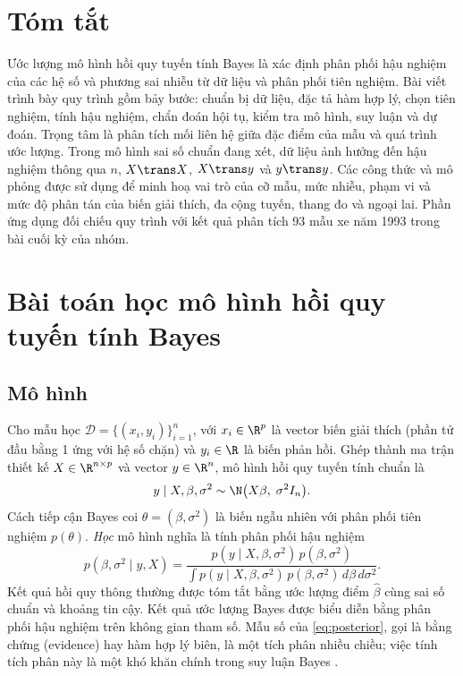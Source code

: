 \documentclass[12pt,a4paper]{report}
\begin{document}
\makereporttitlepage

\chapter*{Tóm tắt}

Ước lượng mô hình hồi quy tuyến tính Bayes là xác định phân phối hậu nghiệm
của các hệ số và phương sai nhiễu từ dữ liệu và phân phối tiên nghiệm. Bài viết
trình bày quy trình gồm bảy bước: chuẩn bị dữ liệu, đặc tả hàm hợp lý, chọn tiên
nghiệm, tính hậu nghiệm, chẩn đoán hội tụ, kiểm tra mô hình, suy luận và dự đoán.
Trọng tâm là phân tích mối liên hệ giữa đặc điểm của mẫu và quá trình ước lượng.
Trong mô hình sai số chuẩn đang xét, dữ liệu ảnh hưởng đến hậu nghiệm thông qua
$n$, $X\trans X$, $X\trans y$ và $y\trans y$. Các công thức và mô phỏng được
sử dụng để minh hoạ vai trò của cỡ mẫu, mức nhiễu, phạm vi và mức độ phân tán
của biến giải thích, đa cộng tuyến, thang đo và ngoại lai. Phần ứng dụng đối
chiếu quy trình với kết quả phân tích 93 mẫu xe năm 1993 trong bài cuối kỳ
của nhóm.

\tableofcontents
\pagebreak

\listoffigures
\listoftables
\newpage

\chapter{Bài toán học mô hình hồi quy tuyến tính Bayes}
\label{sec:problem}

\section{Mô hình}

Cho mẫu học $\mathcal{D} = \{(x_i, y_i)\}_{i=1}^{n}$, với $x_i \in \R^{p}$ là
vector biến giải thích (phần tử đầu bằng 1 ứng với hệ số chặn) và $y_i \in \R$
là biến phản hồi. Ghép thành ma trận thiết kế $X \in \R^{n \times p}$ và vector
$y \in \R^{n}$, mô hình hồi quy tuyến tính chuẩn là
%
\begin{equation}
  \label{eq:model}
  y \mid X, \beta, \sigma^2 \sim \N\bigl(X\beta,\; \sigma^2 I_n\bigr).
\end{equation}
%
Cách tiếp cận Bayes coi $\theta = (\beta, \sigma^2)$ là biến ngẫu nhiên với phân
phối tiên nghiệm $p(\theta)$. \emph{Học} mô hình nghĩa là tính phân phối hậu
nghiệm
%
\begin{equation}
  \label{eq:posterior}
  p(\beta, \sigma^2 \mid y, X) =
  \frac{p(y \mid X, \beta, \sigma^2)\, p(\beta, \sigma^2)}
       {\int p(y \mid X, \beta, \sigma^2)\, p(\beta, \sigma^2)\, d\beta\, d\sigma^2}.
\end{equation}
%
Kết quả hồi quy thông thường được tóm tắt bằng ước lượng điểm $\hat\beta$ cùng
sai số chuẩn và khoảng tin cậy. Kết quả ước lượng Bayes được biểu diễn bằng
phân phối hậu nghiệm trên không gian tham số. Mẫu số của
\eqref{eq:posterior}, gọi là bằng chứng (evidence) hay hàm hợp lý biên, là một
tích phân nhiều chiều; việc tính tích phân này là một khó khăn chính trong suy luận Bayes \cite{gelman2013bda}.
\end{document}

